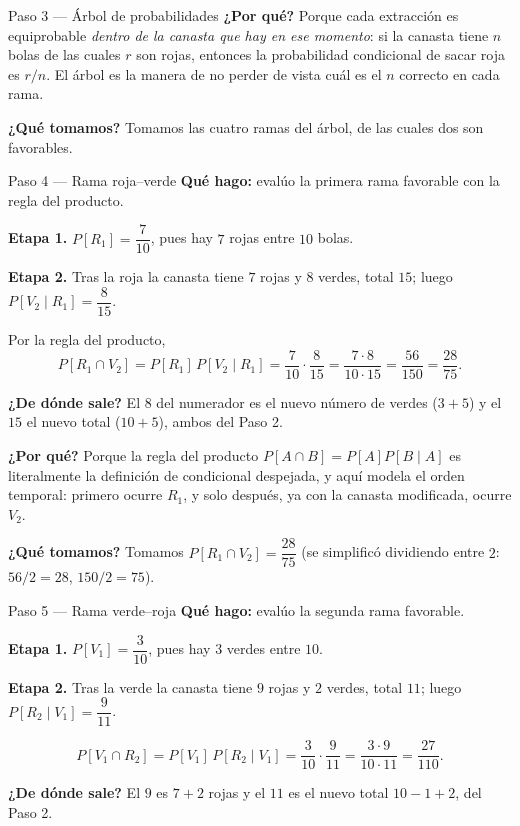 \documentclass[11pt]{article}
\begin{document}
\begin{sol}
\begin{paso}{Paso 3 --- \'Arbol de probabilidades}
\textbf{¿Por qu\'e?} Porque cada extracci\'on es equiprobable \emph{dentro de la canasta que hay en ese momento}: si la canasta tiene $n$ bolas de las cuales $r$ son rojas, entonces la probabilidad condicional de sacar roja es $r/n$. El \'arbol es la manera de no perder de vista cu\'al es el $n$ correcto en cada rama.

\textbf{¿Qu\'e tomamos?} Tomamos las cuatro ramas del \'arbol, de las cuales dos son favorables.
\end{paso}

\begin{paso}{Paso 4 --- Rama roja--verde}
\textbf{Qu\'e hago:} eval\'uo la primera rama favorable con la regla del producto.

\textbf{Etapa 1.} $P[R_1]=\dfrac{7}{10}$, pues hay $7$ rojas entre $10$ bolas.

\textbf{Etapa 2.} Tras la roja la canasta tiene $7$ rojas y $8$ verdes, total $15$; luego $P[V_2\mid R_1]=\dfrac{8}{15}$.

Por la regla del producto,
\[
P[R_1\cap V_2]=P[R_1]\,P[V_2\mid R_1]=\frac{7}{10}\cdot\frac{8}{15}=\frac{7\cdot 8}{10\cdot 15}=\frac{56}{150}=\frac{28}{75}.
\]

\textbf{¿De d\'onde sale?} El $8$ del numerador es el nuevo n\'umero de verdes ($3+5$) y el $15$ el nuevo total ($10+5$), ambos del Paso 2.

\textbf{¿Por qu\'e?} Porque la regla del producto $P[A\cap B]=P[A]P[B\mid A]$ es literalmente la definici\'on de condicional despejada, y aqu\'i modela el orden temporal: primero ocurre $R_1$, y solo despu\'es, ya con la canasta modificada, ocurre $V_2$.

\textbf{¿Qu\'e tomamos?} Tomamos $P[R_1\cap V_2]=\dfrac{28}{75}$ (se simplific\'o dividiendo entre $2$: $56/2=28$, $150/2=75$).
\end{paso}

\begin{paso}{Paso 5 --- Rama verde--roja}
\textbf{Qu\'e hago:} eval\'uo la segunda rama favorable.

\textbf{Etapa 1.} $P[V_1]=\dfrac{3}{10}$, pues hay $3$ verdes entre $10$.

\textbf{Etapa 2.} Tras la verde la canasta tiene $9$ rojas y $2$ verdes, total $11$; luego $P[R_2\mid V_1]=\dfrac{9}{11}$.

\[
P[V_1\cap R_2]=P[V_1]\,P[R_2\mid V_1]=\frac{3}{10}\cdot\frac{9}{11}=\frac{3\cdot 9}{10\cdot 11}=\frac{27}{110}.
\]

\textbf{¿De d\'onde sale?} El $9$ es $7+2$ rojas y el $11$ es el nuevo total $10-1+2$, del Paso 2.


\end{paso}
\end{sol}
\end{document}

